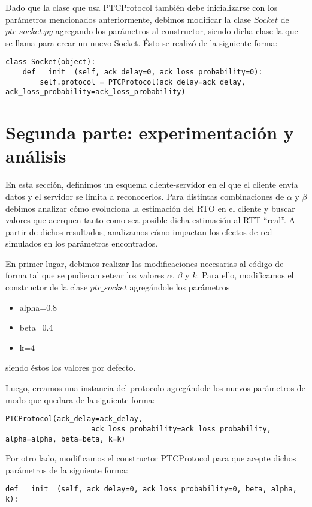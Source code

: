 \documentclass[10pt, a4paper]{article}
\begin{document}
Dado que la clase que usa PTCProtocol también debe inicializarse con los parámetros mencionados anteriormente, debimos modificar la clase $Socket$ de $ptc\_socket.py$ agregando los parámetros al constructor, siendo dicha clase la que se llama para crear un nuevo Socket. Ésto se realizó de la siguiente forma:
\begin{verbatim}
class Socket(object):
    def __init__(self, ack_delay=0, ack_loss_probability=0):
		self.protocol = PTCProtocol(ack_delay=ack_delay, ack_loss_probability=ack_loss_probability)
\end{verbatim}


\section{Segunda parte: experimentación y análisis}

En esta sección, definimos un esquema cliente-servidor en el que el cliente envía datos y el servidor se limita a reconocerlos. Para distintas combinaciones de $\alpha$ y $\beta$ debimos analizar cómo evoluciona la estimación del RTO en el cliente y buscar valores que acerquen tanto como sea posible dicha estimación al RTT ``real''. A partir de dichos resultados, analizamos cómo impactan los efectos de red simulados en los parámetros encontrados.


En primer lugar, debimos realizar las modificaciones necesarias al código de forma tal que se pudieran setear los valores $\alpha$, $\beta$ y $k$. 
Para ello, modificamos el constructor de la clase $ptc\_socket$ agregándole los parámetros 
\begin{itemize}
\item alpha=0.8
\item beta=0.4
\item k=4
\end{itemize}
siendo éstos los valores por defecto.

Luego, creamos una instancia del protocolo agregándole los nuevos parámetros de modo que quedara de la siguiente forma:
\begin{verbatim}
PTCProtocol(ack_delay=ack_delay, 
					ack_loss_probability=ack_loss_probability, alpha=alpha, beta=beta, k=k)
\end{verbatim}

Por otro lado, modificamos el constructor PTCProtocol para que acepte dichos parámetros de la siguiente forma:
\begin{verbatim}
def __init__(self, ack_delay=0, ack_loss_probability=0, beta, alpha, k):
\end{verbatim}
\end{document}
